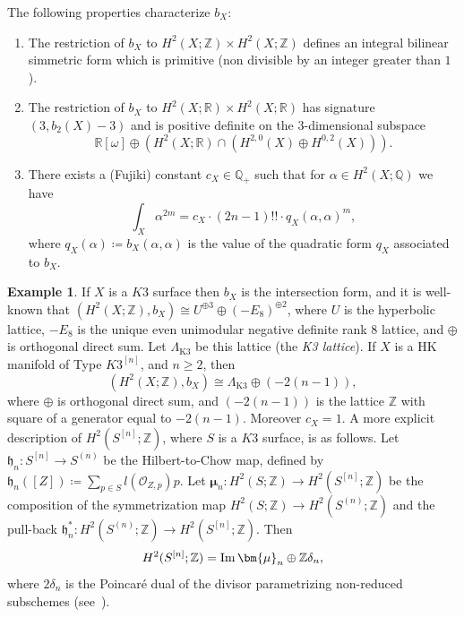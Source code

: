 \documentclass[11pt]{amsart}
\newcommand{\QQ}{{\mathbb Q}}
\newcommand{\RR}{{\mathbb R}}
\newcommand{\ZZ}{{\mathbb Z}}
\let\mathcal\mathscr
\def\cO{\mathcal{O}}
\def\goth{\mathfrak h}
\def\Im{\mathop{\rm Im}\nolimits}
\DeclareMathOperator{\KKK}{K3}
\theoremstyle{definition}
\newtheorem{expl}[lmm]{Example}
\theoremstyle{remark}
\begin{document}
%
The following properties characterize $b_X$:
\begin{enumerate}
%
\item
%
The restriction of $b_X$ to $H^2(X;\ZZ)\times H^2(X;\ZZ)$ defines an integral bilinear simmetric form which is primitive (non divisible by an integer greater than $1$).
%
\item
%
The restriction of $b_X$ to $H^2(X;\RR)\times H^2(X;\RR)$ has signature $(3,b_2(X)-3)$ and is positive definite on the $3$-dimensional subspace
%
\begin{equation}
%
\RR[\omega]\oplus \left(H^2(X;\RR)\cap (H^{2,0}(X)\oplus H^{0,2}(X))\right).
%
\end{equation}
%
%
\item
%
There exists a (Fujiki) constant $c_X\in\QQ_{+}$ such that for $\alpha\in H^2(X;\QQ)$ we have 
%
\begin{equation}\label{formulafujiki}
%
\int_X \alpha^{2m}=c_X \cdot(2n-1)!!\cdot q_X(\alpha,\alpha)^m,
%
\end{equation}
%
where $q_X(\alpha)\coloneqq b_X(\alpha,\alpha)$ is the value of the quadratic form $q_X$ associated to $b_X$. 
%
%
\end{enumerate}
%
\begin{expl}\label{expl:bbfhilb}
%
If $X$ is a $K3$ surface then $b_X$ is the intersection form, and it is well-known that $(H^2(X;\ZZ),b_X)\cong U^{\oplus 3}\oplus (-E_8)^{\oplus 2}$, where $U$ is the hyperbolic lattice, $-E_8$ is the unique even unimodular negative definite rank $8$ lattice, and $\oplus$  is orthogonal direct sum. Let 
$\Lambda_{\KKK}$ be this lattice (the \emph{K3 lattice}). 
If $X$ is a HK manifold of Type $K3^{[n]}$, and $n\ge 2$, then 
%
\begin{equation}\label{bbfk3n}
%
(H^2(X;\ZZ),b_X)\cong \Lambda_{\KKK}\oplus (-2(n-1)),
%
\end{equation}
%
where $\oplus$  is orthogonal direct sum, and $(-2(n-1))$ is the lattice $\ZZ$ with square of a generator equal to $-2(n-1)$. Moreover  $c_X=1$. A more explicit description of  $H^2(S^{[n]};\ZZ)$,  where $S$ is a $K3$ surface, is as follows. Let $\goth_n\colon S^{[n]}\to S^{(n)}$ be  the Hilbert-to-Chow map, defined by $\goth_n([Z])\coloneqq  \sum_{p\in S}l(\cO_{Z,p})p$. Let
$\bm{\mu}_n\colon H^2(S;\ZZ)\to H^2(S^{[n]};\ZZ)$ be the composition of the symmetrization map $H^2(S;\ZZ)\to H^2(S^{(n)};\ZZ)$ and the pull-back  $\goth_n^{*}\colon  H^2(S^{(n)};\ZZ) \to H^2(S^{[n]};\ZZ)$.
  Then
%
\begin{equation}\label{bbfk3n}
%
H^2(S^{[n]};\ZZ)=\Im \bm{\mu}_n \oplus \ZZ \delta_n,
%
\end{equation}
%
where $2\delta_n$ is the Poincar\'e dual of the divisor  parametrizing non-reduced subschemes (see~\cite{dlmo:cetraro22}).
%
\end{expl}
%
\end{document}
